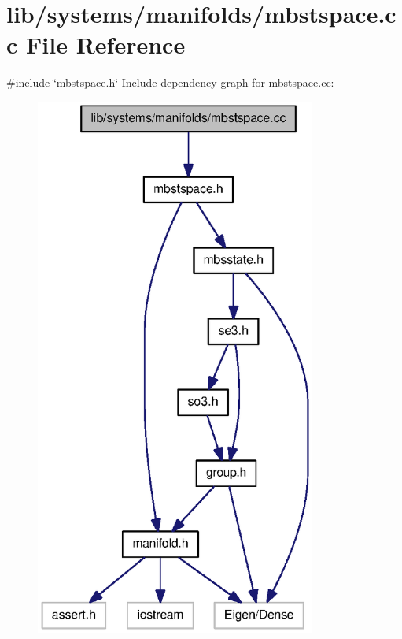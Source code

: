 \section{lib/systems/manifolds/mbstspace.cc \-File \-Reference}
\label{mbstspace_8cc}
{\ttfamily \#include \char`\"{}mbstspace.\-h\char`\"{}}\*
\-Include dependency graph for mbstspace.\-cc\-:
\nopagebreak
\begin{figure}[H]
\begin{center}
\leavevmode
\includegraphics[width=262pt]{mbstspace_8cc__incl}
\end{center}
\end{figure}
